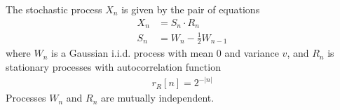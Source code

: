 \else

The stochastic process  $X_n$ is given by the  pair of equations
\begin{align*}
X_n &= S_n \cdot R_n   \\
S_n &= W_n - \frac12 W_{n-1}
\end{align*}
where $W_n$ is a Gaussian i.i.d. process with mean $0$ and variance $v$, and $R_n$ is stationary processes with autocorrelation function
\begin{align*}
r_R[n] = 2^{-|n|} 
\end{align*}
Processes $W_n$ and $R_n$ are mutually independent.

